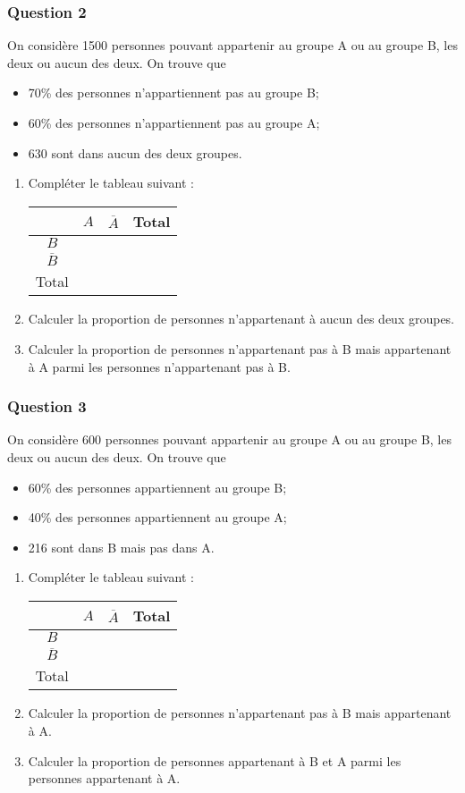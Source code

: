 \documentclass[15pt, mathserif]{beamer}
\begin{document}
\begin{frame} 
	\frametitle{Question 2}
On considère 1500 personnes pouvant appartenir au groupe A ou au groupe B, les deux ou aucun des deux. On trouve que 
 \begin{itemize} 
 \item 70\%  des personnes n'appartiennent pas au groupe B; 
 \item 60\% des personnes n'appartiennent pas au groupe A; 
 \item 630 sont dans aucun des deux groupes.
 \end{itemize} 
 \begin{enumerate} 
 \item Compléter le tableau suivant : 
 \hfil \begin{tabular}{|c|c|c|c|} 
 \cline{2-4}   
 \multicolumn{1}{c|}{} & $A$ & $\overline{A}$ & Total\\ \hline 
 $B$  &    & &   \\\hline 
 $\overline{B}$   &  &    &    \\\hline	
 Total   & &  &  \\\hline  
 \end{tabular} 
 \item Calculer la proportion de personnes n'appartenant  à aucun des deux groupes. 
 \item Calculer la proportion de personnes n'appartenant pas à B mais appartenant à A parmi les personnes n'appartenant pas à B. 
  \end{enumerate} 
 \end{frame}


\begin{frame} 
	\frametitle{Question 3}
On considère 600 personnes pouvant appartenir au groupe A ou au groupe B, les deux ou aucun des deux. On trouve que 
 \begin{itemize} 
 \item 60\%  des personnes appartiennent au groupe B; 
 \item 40\% des personnes appartiennent au groupe A; 
 \item 216 sont dans B mais pas dans A.
 \end{itemize} 
 \begin{enumerate} 
 \item Compléter le tableau suivant : 
 \hfil \begin{tabular}{|c|c|c|c|} 
 \cline{2-4}   
 \multicolumn{1}{c|}{} & $A$ & $\overline{A}$ & Total\\ \hline 
 $B$  &    & &   \\\hline 
 $\overline{B}$   &  &    &    \\\hline	
 Total   & &  &  \\\hline  
 \end{tabular} 
 \item Calculer la proportion de personnes n'appartenant pas à B mais appartenant à A. 
 \item Calculer la proportion de personnes appartenant à B et A parmi les personnes appartenant à A. 
  \end{enumerate} 
 \end{frame}
\end{document}
